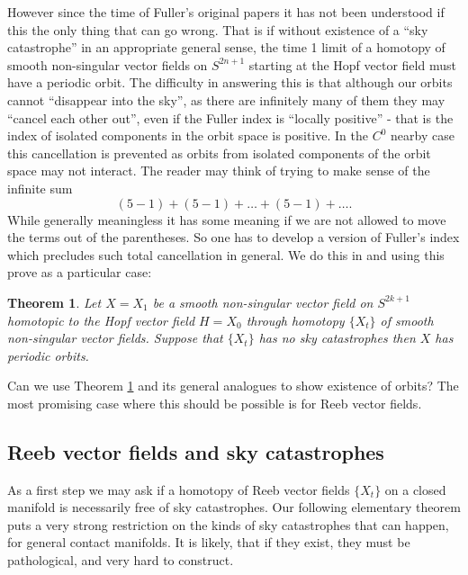 \documentclass{amsart}
\numberwithin{equation}{section}
\newtheorem{theorem}{Theorem}
\theoremstyle{definition}
\theoremstyle{remark}
\begin{document}
However since the time of Fuller's original papers it has not been
understood if this the only thing that can go wrong. That is if without 
existence of a ``sky catastrophe'' in an appropriate general sense, the time 1
limit of a homotopy of smooth non-singular vector fields on $S ^{2n+1} $
starting at the Hopf vector field must have a periodic orbit.
The difficulty in answering this is that
although our orbits cannot ``disappear into the sky'', as there are infinitely
many of them they may ``cancel each other out'', even if the Fuller index is
``locally positive'' - that is the index of isolated components in the orbit space is positive.
In the $C ^{0} $ nearby case this cancellation is prevented as orbits from isolated components of the orbit space may not
interact.
The reader may think of trying to make sense of the
infinite sum $$ (5-1) + (5-1) + \ldots + (5-1) + \ldots.
$$ 
While generally meaningless it has some meaning if we are not allowed to move
the terms out of the parentheses.
So one has to develop a version
of Fuller's index which precludes such total cancellation in general. We do this in \cite{citeSavelyevFuller} and using this prove as a particular case:
\begin{theorem} \label{conj:preliminary} Let $X = X _{1} $ be a smooth non-singular vector field on $S ^{2k+1} $ homotopic to
the Hopf vector field $H = X _{0} $ through  homotopy  $\{X _{t} \}$ of smooth non-singular vector fields.
Suppose that $\{X _{t} \}$ has no sky catastrophes
then $X$ has periodic orbits.
\end{theorem}
Can we use Theorem \ref{conj:preliminary} and its general analogues
to show existence of orbits? The most promising case where this should be possible is for Reeb vector fields.
\subsection {Reeb vector fields and sky catastrophes}
As a first step we may
ask if a homotopy of Reeb vector fields $\{X _{t}
\}$ on a closed manifold is necessarily free of sky catastrophes.  Our following elementary theorem puts
a very strong restriction on the kinds of sky catastrophes that can happen, for
general contact manifolds. 
It is likely, that if they exist, they must be pathological, and very hard to construct.
\end{document}
